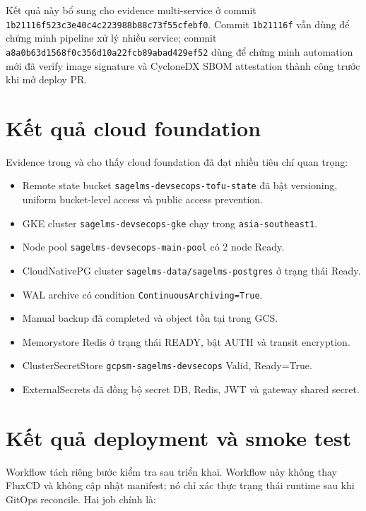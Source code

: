 Kết quả này bổ sung cho evidence multi-service ở commit \texttt{1b21116f523c3e40c4c223988b88c73f55cfebf0}. Commit \texttt{1b21116f} vẫn dùng để chứng minh pipeline xử lý nhiều service; commit \texttt{a8a0b63d1568f0c356d10a22fcb89abad429ef52} dùng để chứng minh automation mới đã verify image signature và CycloneDX SBOM attestation thành công trước khi mở deploy PR.

\section{Kết quả cloud foundation}

Evidence trong  và  cho thấy cloud foundation đã đạt nhiều tiêu chí quan trọng:

\begin{itemize}
  \item Remote state bucket \texttt{sagelms-devsecops-tofu-state} đã bật versioning, uniform bucket-level access và public access prevention.
  \item GKE cluster \texttt{sagelms-devsecops-gke} chạy trong \texttt{asia-southeast1}.
  \item Node pool \texttt{sagelms-devsecops-main-pool} có 2 node Ready.
  \item CloudNativePG cluster \texttt{sagelms-data/sagelms-postgres} ở trạng thái Ready.
  \item WAL archive có condition \texttt{ContinuousArchiving=True}.
  \item Manual backup đã completed và object tồn tại trong GCS.
  \item Memorystore Redis ở trạng thái READY, bật AUTH và transit encryption.
  \item ClusterSecretStore \texttt{gcpsm-sagelms-devsecops} Valid, Ready=True.
  \item ExternalSecrets đã đồng bộ secret DB, Redis, JWT và gateway shared secret.
\end{itemize}

\section{Kết quả deployment và smoke test}

Workflow  tách riêng bước kiểm tra sau triển khai. Workflow này không thay FluxCD và không cập nhật manifest; nó chỉ xác thực trạng thái runtime sau khi GitOps reconcile. Hai job chính là:

